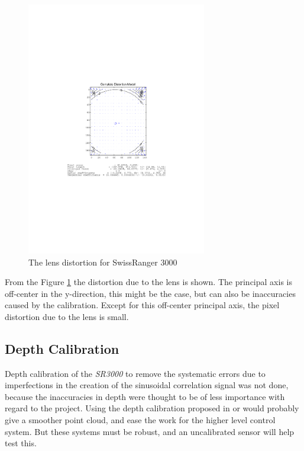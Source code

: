\begin{figure}[htbp]
    \centering
    \includegraphics[width=0.7\textwidth]{pics/sr3000_comp_dist}
    \caption{The lens distortion for SwissRanger 3000}
    \label{chap3:fig-sr3000-comp-lensdist}
\end{figure}
From the Figure \ref{chap3:fig-sr3000-comp-lensdist} the distortion due to the lens is shown.
The principal axis is off-center in the y-direction, this might be the case, but can also
be inaccuracies caused by the calibration. Except for this off-center principal axis, the
pixel distortion due to the lens is small.


\subsection{Depth Calibration}
\label{chap3:subsec-depht-calib}
Depth calibration of the \emph{SR3000} to remove the systematic errors due to
imperfections in the creation of the sinusoidal correlation signal was not done, 
because the inaccuracies in depth
were thought to be of less importance with regard to the project. Using the depth
calibration proposed in \cite{sr3000} or \cite{tof-calibration} would probably give a
smoother point cloud, and ease the work for the higher level control system. But these
systems must be robust, and an uncalibrated sensor will help test this. 



